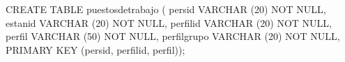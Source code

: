 \lstset{caption=Crear tabla ``puestosdetrabajo'',label=sql:crearTablaPuestosdetrabajo}
\begin{SQL}
CREATE TABLE puestosdetrabajo (
persid VARCHAR (20) NOT NULL,
estanid VARCHAR (20) NOT NULL,
perfilid VARCHAR (20) NOT NULL,
perfil VARCHAR (50) NOT NULL,
perfilgrupo VARCHAR (20) NOT NULL,
PRIMARY KEY (persid, perfilid, perfil));
\end{SQL}
